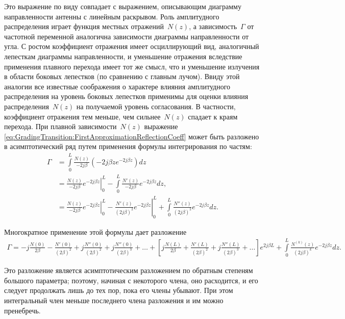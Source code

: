 Это выражение по виду совпадает с выражением, описывающим диаграмму
направленности антенны с линейным раскрывом. Роль амплитудного распределения
играет функция местных отражений~$N(z)$, а зависимость~$\Gamma$ от частотной
переменной аналогична зависимости диаграммы направленности от угла. С ростом
коэффициент отражения имеет осциллирующий вид, аналогичный лепесткам диаграммы
направленности, и уменьшение отражения вследствие применения плавного перехода
имеет тот же смысл, что и уменьшение излучения в области боковых лепестков
(по сравнению с главным лучом). Ввиду этой аналогии все известные соображения
о характере влияния амплитудного распределения на уровень боковых лепестков
применимы для оценки влияния распределения~$N(z)$ на получаемой уровень
согласования. В частности, коэффициент отражения тем меньше, чем сильнее~$N(z)$
спадает к краям перехода.
При плавной зависимости~$N(z)$ выражение \eqref{eq:GradingTransition:FirstApproximationReflectionCoeff} может быть разложено
в асимптотический ряд путем применения формулы интегрирования по частям:
\begin{align*}
    \Gamma
    &= \int\limits_0^L \frac{N(z)}{-2j\beta}
       \left( -2j \beta z e^{-2j\beta z} \right) dz \\
    &= \left.\frac{N(z)}{-2j\beta} e^{-2j\beta z} \right|_0^L -
       \int\limits_0^L \frac{N'(z)}{-2j\beta} e^{-2j\beta z} dz, \\
    &= \left.\frac{N(z)}{-2j\beta} e^{-2j\beta z} \right|_0^L -
       \left.\frac{N'(z)}{(2j\beta)^2} e^{-2j\beta z} \right|_0^L +
       \int\limits_0^L \frac{N''(z)}{(2j\beta)^2} e^{-2j\beta z} dz.
\end{align*}

Многократное применение этой формулы дает разложение
\begin{multline}
    \label{eq:GradingTransition:GammaSeries}
    \Gamma =
        -j\frac{N(0)}{2\beta}
        -\frac{N'(0)}{(2\beta)^2}
        +j\frac{N''(0)}{(2\beta)^2}
        +j\frac{N''(0)}{(2\beta)^3}
        + \ldots
        + \left[
            j\frac{N(L)}{2\beta}
            +\frac{N'(L)}{(2\beta)^2}
            +j\frac{N''(L)}{(2\beta)^3}
            +\ldots
        \right] e^{2j\beta L}
        + \int\limits_0^L \frac{N^{(k)}(z)}{(2j\beta)^k} e^{-2j\beta z}dz.
\end{multline}

Это разложение является асимптотическим разложением по обратным степеням
большого параметра; поэтому, начиная с некоторого члена, оно расходится, и его
следует продолжать лишь до тех пор, пока его члены убывают. При этом
интегральный член меньше последнего члена разложения  и им можно пренебречь.


